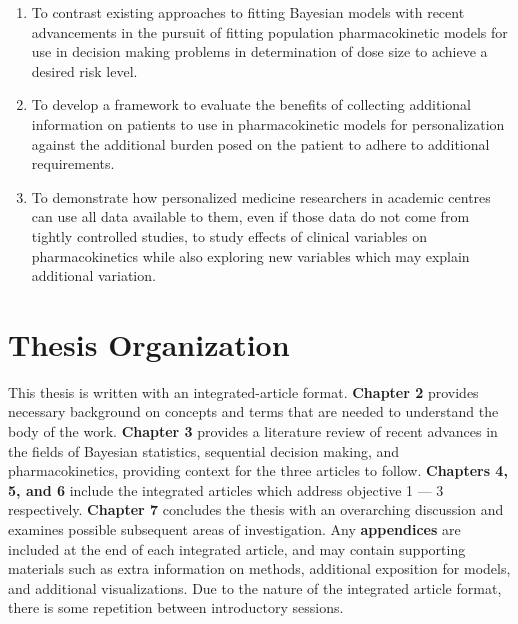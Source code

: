 \begin{enumerate}[1)]
	\item To contrast existing approaches to fitting Bayesian models with recent advancements in the pursuit of fitting population pharmacokinetic models for use in decision making problems in determination of dose size to achieve a desired risk level.
	
	\item To develop a framework to evaluate the  benefits of collecting additional information on patients to use in pharmacokinetic models for personalization against the additional burden posed on the patient to adhere to additional requirements.
	
	\item To demonstrate how personalized medicine researchers in academic centres can use all data available to them, even if those data do not come from tightly controlled studies, to study effects of clinical variables on pharmacokinetics while also exploring new variables which may explain additional variation.
\end{enumerate}

\section{Thesis Organization}

This thesis is written with an integrated-article format.  \textbf{Chapter 2} provides necessary background on  concepts and terms that are needed to understand the body of the work.  \textbf{Chapter 3} provides a literature review of recent advances in the fields of Bayesian statistics, sequential decision making, and pharmacokinetics, providing context for the three articles to follow.  \textbf{Chapters 4, 5, and 6} include the integrated articles which address objective 1 --- 3 respectively.  \textbf{Chapter 7} concludes the thesis with an overarching discussion and examines possible subsequent areas of investigation.  Any \textbf{appendices} are included at the end of each integrated article, and may contain supporting materials such as extra information on methods, additional exposition for models, and additional visualizations.  Due to the nature of the integrated article format, there is some repetition between introductory sessions.